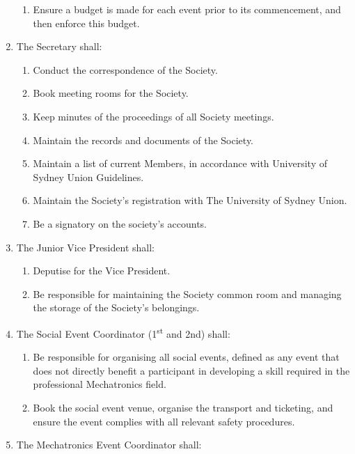 \documentclass[11pt]{article}
\begin{document}
\begin{enumerate}[\thesection .1]
\begin{enumerate}[\hspace{5mm}5.3.1]
        \item Ensure a budget is made for each event prior to its commencement, and then enforce this budget.
    \end{enumerate}
    \item The Secretary shall:
    \begin{enumerate}[\hspace{5mm}5.4.1]
        \item Conduct the correspondence of the Society.
        \item Book meeting rooms for the Society.
        \item Keep minutes of the proceedings of all Society meetings.
        \item Maintain the records and documents of the Society.
        \item Maintain a list of current Members, in accordance with University of Sydney Union Guidelines.
        \item Maintain the Society’s registration with The University of Sydney Union.
        \item Be a signatory on the society’s accounts.
    \end{enumerate}
    \item The Junior Vice President shall:
    \begin{enumerate}[\hspace{5mm}5.5.1]
        \item Deputise for the Vice President.
        \item Be responsible for maintaining the Society common room and managing the storage of the Society's belongings.
    \end{enumerate}
    \item The Social Event Coordinator (1\textsuperscript{st} and 2nd) shall:
    \begin{enumerate}
        \item Be responsible for organising all social events, defined as any event that does not directly benefit a participant in developing a skill required in the professional Mechatronics field.
        \item Book the social event venue, organise the transport and ticketing, and ensure the event complies with all relevant safety procedures.
    \end{enumerate}
    \item The Mechatronics Event Coordinator shall:

\end{enumerate}
\end{document}
